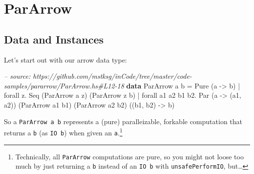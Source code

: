\documentclass[]{article}
\newenvironment{Shaded}{}{}
\newcommand{\KeywordTok}[1]{\textcolor[rgb]{0.00,0.44,0.13}{\textbf{{#1}}}}
\newcommand{\DataTypeTok}[1]{\textcolor[rgb]{0.56,0.13,0.00}{{#1}}}
\newcommand{\CommentTok}[1]{\textcolor[rgb]{0.38,0.63,0.69}{\textit{{#1}}}}
\newcommand{\OtherTok}[1]{\textcolor[rgb]{0.00,0.44,0.13}{{#1}}}
\newcommand{\FunctionTok}[1]{\textcolor[rgb]{0.02,0.16,0.49}{{#1}}}
\newcommand{\NormalTok}[1]{{#1}}
\begin{document}
\section{ParArrow}\label{pararrow}

\subsection{Data and Instances}\label{data-and-instances}

Let's start out with our arrow data type:

\begin{Shaded}
\begin{Highlighting}[]
\CommentTok{-- source: https://github.com/mstksg/inCode/tree/master/code-samples/pararrow/ParArrow.hs#L12-18}
\KeywordTok{data} \DataTypeTok{ParArrow} \NormalTok{a b }\FunctionTok{=}                     \DataTypeTok{Pure}  \NormalTok{(a }\OtherTok{->} \NormalTok{b)}
                  \FunctionTok{|} \NormalTok{forall z}\FunctionTok{.}           \DataTypeTok{Seq}   \NormalTok{(}\DataTypeTok{ParArrow} \NormalTok{a z)}
                                              \NormalTok{(}\DataTypeTok{ParArrow} \NormalTok{z b)}
                  \FunctionTok{|} \NormalTok{forall a1 a2 b1 b2}\FunctionTok{.} \DataTypeTok{Par}   \NormalTok{(a }\OtherTok{->} \NormalTok{(a1, a2))}
                                              \NormalTok{(}\DataTypeTok{ParArrow} \NormalTok{a1 b1)}
                                              \NormalTok{(}\DataTypeTok{ParArrow} \NormalTok{a2 b2)}
                                              \NormalTok{((b1, b2) }\OtherTok{->} \NormalTok{b)}
\end{Highlighting}
\end{Shaded}

So a \texttt{ParArrow\ a\ b} represents a (pure) paralleizable, forkable
computation that returns a \texttt{b} (as \texttt{IO\ b}) when given an
\texttt{a}.\footnote{Technically, all \texttt{ParArrow} computations are
  pure, so you might not loose too much by just returning a \texttt{b}
  instead of an \texttt{IO\ b} with \texttt{unsafePerformIO},
  but\ldots{}}
\end{document}
